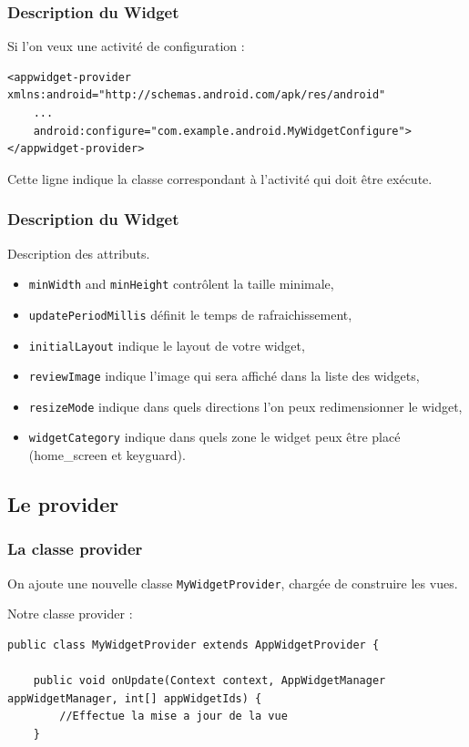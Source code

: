 \documentclass{beamer}
\begin{document}
\begin{frame}[fragile]
\frametitle{Description du Widget}

\begin{exampleblock}{Si l'on veux une activité de configuration : }
\lstset{language=xml}
\begin{lstlisting}
<appwidget-provider xmlns:android="http://schemas.android.com/apk/res/android"
    ...
    android:configure="com.example.android.MyWidgetConfigure">
</appwidget-provider>
\end{lstlisting}
\end{exampleblock}

\begin{block}{}
Cette ligne indique la classe correspondant à l'activité qui doit être exécute.
\end{block}
\end{frame}

\begin{frame}
\frametitle{Description du Widget}
\begin{block}{Description des attributs.}
\begin{itemize}
\item \verb!minWidth! and \verb!minHeight! contrôlent la taille minimale,
\item \verb!updatePeriodMillis! définit le temps de rafraichissement,
\item \verb!initialLayout! indique le layout de votre widget,
\item \verb!reviewImage! indique l'image qui sera affiché dans la liste des widgets,
\item \verb!resizeMode! indique dans quels directions l'on peux redimensionner le widget,
\item \verb!widgetCategory! indique dans quels zone le widget peux être placé (home\_screen et keyguard).
\end{itemize}
\end{block}
\end{frame}

\subsection{Le provider}

\begin{frame}[fragile]
\frametitle{La classe provider}
On ajoute une nouvelle classe \verb!MyWidgetProvider!, chargée de construire les vues.
\begin{exampleblock}{Notre classe provider :}
\lstset{language=java}
\begin{lstlisting}
public class MyWidgetProvider extends AppWidgetProvider {

    public void onUpdate(Context context, AppWidgetManager appWidgetManager, int[] appWidgetIds) {
        //Effectue la mise a jour de la vue
    }
\end{lstlisting}
\end{exampleblock}
\end{frame}
\end{document}
